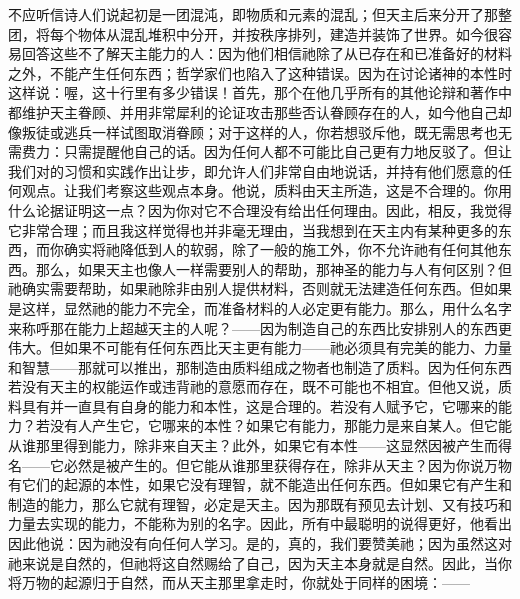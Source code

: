 不应听信诗人们说起初是一团混沌，即物质和元素的混乱；但天主后来分开了那整团，将每个物体从混乱堆积中分开，并按秩序排列，建造并装饰了世界。如今很容易回答这些不了解天主能力的人：因为他们相信祂除了从已存在和已准备好的材料之外，不能产生任何东西；哲学家们也陷入了这种错误。因为在讨论诸神的本性时这样说：喔，这十行里有多少错误！首先，那个在他几乎所有的其他论辩和著作中都维护天主眷顾、并用非常犀利的论证攻击那些否认眷顾存在的人，如今他自己却像叛徒或逃兵一样试图取消眷顾；对于这样的人，你若想驳斥他，既无需思考也无需费力：只需提醒他自己的话。因为任何人都不可能比自己更有力地反驳了。但让我们对的习惯和实践作出让步，即允许人们非常自由地说话，并持有他们愿意的任何观点。让我们考察这些观点本身。他说，质料由天主所造，这是不合理的。你用什么论据证明这一点？因为你对它不合理没有给出任何理由。因此，相反，我觉得它非常合理；而且我这样觉得也并非毫无理由，当我想到在天主内有某种更多的东西，而你确实将祂降低到人的软弱，除了一般的施工外，你不允许祂有任何其他东西。那么，如果天主也像人一样需要别人的帮助，那神圣的能力与人有何区别？但祂确实需要帮助，如果祂除非由别人提供材料，否则就无法建造任何东西。但如果是这样，显然祂的能力不完全，而准备材料的人必定更有能力。那么，用什么名字来称呼那在能力上超越天主的人呢？——因为制造自己的东西比安排别人的东西更伟大。但如果不可能有任何东西比天主更有能力——祂必须具有完美的能力、力量和智慧——那就可以推出，那制造由质料组成之物者也制造了质料。因为任何东西若没有天主的权能运作或违背祂的意愿而存在，既不可能也不相宜。但他又说，质料具有并一直具有自身的能力和本性，这是合理的。若没有人赋予它，它哪来的能力？若没有人产生它，它哪来的本性？如果它有能力，那能力是来自某人。但它能从谁那里得到能力，除非来自天主？此外，如果它有本性——这显然因被产生而得名——它必然是被产生的。但它能从谁那里获得存在，除非从天主？因为你说万物有它们的起源的本性，如果它没有理智，就不能造出任何东西。但如果它有产生和制造的能力，那么它就有理智，必定是天主。因为那既有预见去计划、又有技巧和力量去实现的能力，不能称为别的名字。因此，所有中最聪明的说得更好，他看出因此他说：因为祂没有向任何人学习。是的，真的，我们要赞美祂；因为虽然这对祂来说是自然的，但祂将这自然赐给了自己，因为天主本身就是自然。因此，当你将万物的起源归于自然，而从天主那里拿走时，你就处于同样的困境：——\par

